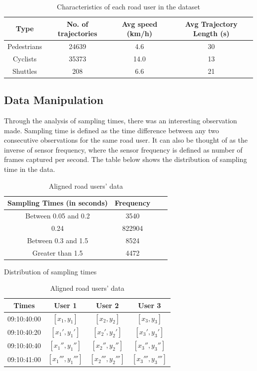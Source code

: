\documentclass{article}
\begin{document}
\begin{table}[H]
\begin{center}
\begin{tabular}{ cccc } 
\hline
Type & No. of trajectories & Avg speed (km/h) & Avg Trajectory Length (s)\\
\hline
Pedestrians & 24639 & 4.6 &30\\ 
Cyclists & 35373 & 14.0 &13\\ 
Shuttles & 208 & 6.6 &21\\
\hline
\end{tabular}
\caption{\label{tab:road-user}Characteristics of each road user in the dataset}
\end{center}
\end{table}




\subsection{Data Manipulation}
Through the analysis of sampling times, there was an interesting observation made. Sampling time is defined as the time difference between any two consecutive observations for the same road user. It can also be thought of as the inverse of sensor frequency, where the sensor frequency is defined as number of frames captured per second. The table below shows the distribution of sampling time in the data.



\begin{table}[H]
\parbox{.45\linewidth}{
\centering
\begin{tabular}{@{}cccc@{}}
\toprule
Sampling Times (in seconds) & Frequency\\ \midrule
Between 0.05 and 0.2 & 3540\\ 
0.24 & 822904 \\  
Between 0.3 and 1.5 & 8524 \\  
Greater than 1.5 & 4472 \\
\bottomrule
\end{tabular}
\caption{Distribution of sampling times}
\label{table:sampling_time}
}
\hfill
\parbox{.45\linewidth}{
\centering
\begin{tabular}{@{}cccc@{}}
\toprule
Times & User 1 & User 2 & User 3 \\ \midrule
09:10:40:00  & $[x_1,y_1]$ & $[x_2,y_2]$ & $[x_3,y_3]$ \\
09:10:40:20 & $[x_1',y_1']$ & $[x_2',y_2']$ & $[x_3',y_3']$\\
09:10:40:40 & $[x_1'',y_1'']$ & $[x_2'',y_2'']$ & $[x_3'',y_3'']$\\
09:10:41:00 & $[x_1''',y_1''']$ & $[x_2''',y_2''']$ & $[x_3''',y_3''']$\\
\bottomrule
\end{tabular}
\caption{Aligned road users' data}
\label{table:common_axis_data}
}
\end{table}
\end{document}
